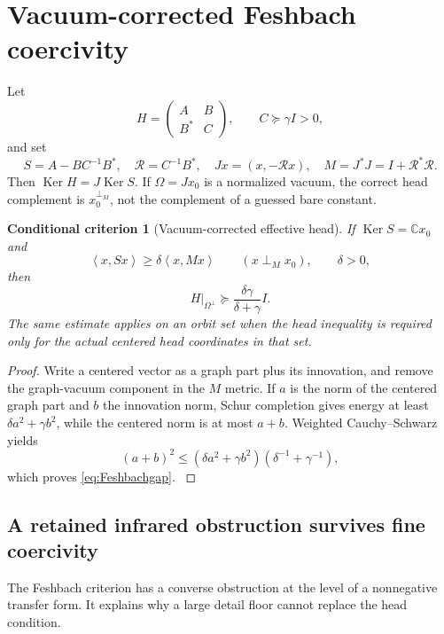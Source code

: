 \documentclass[11pt,oneside,openany]{book}
\newtheorem{criterion}[criterion]{Conditional criterion}
\theoremstyle{definition}
\theoremstyle{remark}
\newcommand{\C}{\mathbb C}
\newcommand{\Ker}{\operatorname{Ker}}
\newcommand{\ip}[2]{\left\langle#1,#2\right\rangle}
\newcommand{\src}[2]{\cite[#2]{#1}}
\begin{document}
\section{Vacuum-corrected Feshbach coercivity}
Let
\[
H=\begin{pmatrix}A&B\\B^*&C\end{pmatrix},\qquad C\succeq\gamma I>0,
\]
and set
\begin{equation}\label{eq:Feshbach}
S=A-BC^{-1}B^*,\quad \mathcal R=C^{-1}B^*,\quad
Jx=(x,-\mathcal Rx),\quad M=J^*J=I+\mathcal R^*\mathcal R.
\end{equation}
Then $\Ker H=J\Ker S$. If $\Omega=Jx_0$ is a normalized vacuum, the correct head complement is $x_0^{\perp_M}$, not the complement of a guessed bare constant.

\begin{criterion}[Vacuum-corrected effective head]\label{thm:Feshbach}
If $\Ker S=\C x_0$ and
\[
\ip{x}{Sx}\ge\delta\ip{x}{Mx}\qquad(x\perp_Mx_0),
\qquad\delta>0,
\]
then
\begin{equation}\label{eq:Feshbachgap}
H|_{\Omega^\perp}\succeq\frac{\delta\gamma}{\delta+\gamma}I.
\end{equation}
The same estimate applies on an orbit set when the head inequality is required only for the actual centered head coordinates in that set.
\end{criterion}
\begin{proof}
Write a centered vector as a graph part plus its innovation, and remove the graph-vacuum component in the $M$ metric. If $a$ is the norm of the centered graph part and $b$ the innovation norm, Schur completion gives energy at least $\delta a^2+\gamma b^2$, while the centered norm is at most $a+b$. Weighted Cauchy--Schwarz yields
\[
(a+b)^2\le(\delta a^2+\gamma b^2)(\delta^{-1}+\gamma^{-1}),
\]
which proves \cref{eq:Feshbachgap}. \src{F1}{V3--V4}
\end{proof}

\subsection{A retained infrared obstruction survives fine coercivity}
The Feshbach criterion has a converse obstruction at the level of a
nonnegative transfer form. It explains why a large detail floor cannot
replace the head condition.
\end{document}
